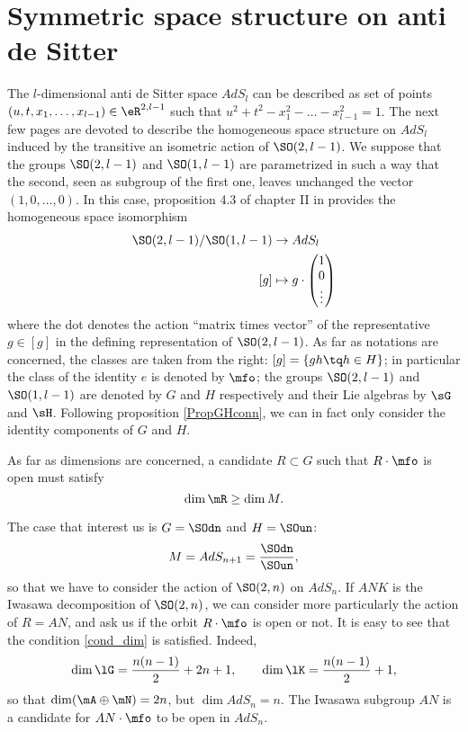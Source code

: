 \section{Symmetric space structure on anti de Sitter}\label{SecSymeStructAdS}

The $l$-dimensional anti de Sitter space $AdS_l$ can be described as set of points $(u,t,x_1,\ldots,x_{l-1})\in \eR^{2,l-1}$  such that $u^2+t^2-x_1^2-\ldots-x_{l-1}^2=1$. The next few pages are devoted to describe the homogeneous space structure on $AdS_l$ induced by the transitive an isometric action of $\SO(2,l-1)$. We suppose that the groups $\SO(2,l-1)$ and $\SO(1,l-1)$ are parametrized in such a way that the second, seen as subgroup of the first one, leaves unchanged the vector $(1,0,\ldots,0)$. In this case, proposition 4.3 of chapter II in \cite{Helgason} provides the homogeneous space isomorphism
\begin{equation}
\begin{aligned}
  \SO(2,l-1)/\SO(1,l-1)&\to AdS_l \\ 
[g]&\mapsto  
 g\cdot
\begin{pmatrix}
1\\0\\\vdots
\end{pmatrix}
\end{aligned}
\end{equation}
where the dot denotes the action ``matrix times vector'' of the representative $g\in [g]$ in the defining representation of $\SO(2,l-1)$. As far as notations are concerned, the classes are taken from the right:  $[g]=\{gh\tq h\in H\}$; in particular the class of the identity $e$ is denoted by $\mfo$; the groups $\SO(2,l-1)$ and $\SO(1,l-1)$ are denoted by $G$ and $H$ respectively and their Lie algebras by $\sG$ and $\sH$. Following proposition \ref{PropGHconn}, we can in fact only consider the identity components of $G$ and $H$.

As far as dimensions are concerned, a candidate $R\subset G$ such that $R\cdot\mfo$ is open must satisfy
\begin{equation}\label{cond_dim}
                  \dim\mR\geq\dim M.
\end{equation}

The case that interest us is $G=\SOdn$ and $H=\SOun$:
\[
M=AdS_{n+1}=\dfrac{\SOdn}{\SOun},
\]
 so that we have to consider the action of $\SO(2,n)$ on $AdS_n$.  If $ANK$ is the Iwasawa decomposition of $\SO(2,n)$, we can consider more particularly the action of $R=AN$, and ask us if the orbit $R\cdot\mfo$ is open or not. It is easy to see that the condition \eqref{cond_dim} is satisfied. Indeed,
\[
 \dim\lG=\frac{n(n-1)}{2}+2n+1,\qquad\dim\lK=\frac{n(n-1)}{2}+1,
\]
so that $\dim(\mA\oplus\mN)=2n$, but $\dim AdS_n=n$. The Iwasawa subgroup $AN$ is a candidate for $AN\cdot\mfo$ to be open in $AdS_n$.

